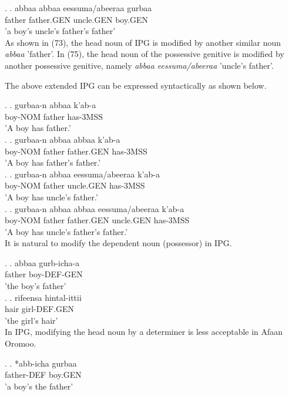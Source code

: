 \documentclass[11pt,a4paper]{article}
\begin{document}
	\ex.
	\ag.
	abbaa abbaa eessuma/abeeraa gurbaa\\
	father father.GEN uncle.GEN boy.GEN\\
	'a boy's uncle's father's father'\\
	
	As shown in (73), the head noun of IPG is modified by another similar noun \emph{abbaa} 'father'. In (75), the head noun of the possessive genitive is modified by another possessive genitive, namely \emph{abbaa eessuma/abeeraa} 'uncle's father'. 
	
	The above extended IPG can be expressed syntactically as shown below.
	
	\ex.
	\ag.
	gurbaa-n abbaa k'ab-a\\
	boy-NOM father has-3MSS\\
	'A boy has father.'\\
	
	\ex.
	\ag.
	gurbaa-n abbaa abbaa k'ab-a\\
	boy-NOM father father.GEN has-3MSS\\
	'A boy has father's father.'\\
	
	\ex.
	\ag.
	gurbaa-n abbaa eessuma/abeeraa k'ab-a\\
	boy-NOM father uncle.GEN has-3MSS\\
	'A boy has uncle's father.'\\
	
	\ex.
	\ag.
	gurbaa-n abbaa abbaa eessuma/abeeraa k'ab-a\\
	boy-NOM father father.GEN uncle.GEN has-3MSS\\
	'A boy has uncle's father's father.'\\
	
	It is natural to modify the dependent noun (possessor) in IPG.
		
	\ex.
	\ag.
	abbaa gurb-icha-a\\
	father boy-DEF-GEN\\
	'the boy's father'\\
	
	\ex.
	\ag.
	rifeensa hintal-ittii\\
	hair girl-DEF.GEN\\
	'the girl's hair'\\
	
	In IPG, modifying the head noun by a determiner is less acceptable in Afaan Oromoo.
	
	\ex.
	\ag.
	*abb-icha gurbaa\\
	father-DEF boy.GEN\\
	'a boy's the father'\\
	
\end{document}

